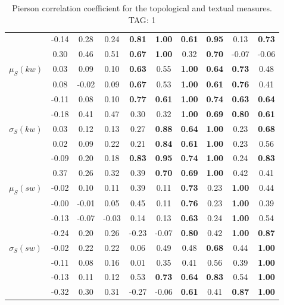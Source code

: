 \begin{table*}[h!]
\begin{center}
\begin{tabular}{| l || c | c | c | c | c | c | c | c | c |}
 & -0.14 & 0.28 & 0.24 & {\bf 0.81} & {\bf 1.00} & {\bf 0.61} & {\bf 0.95} & 0.13 & {\bf 0.73} \\
 & 0.30 & 0.46 & 0.51 & {\bf 0.67} & {\bf 1.00} & 0.32 & {\bf 0.70} & -0.07 & -0.06 \\\hline
$\mu_S(kw)$ & 0.03 & 0.09 & 0.10 & {\bf 0.63} & 0.55 & {\bf 1.00} & {\bf 0.64} & {\bf 0.73} & 0.48 \\
 & 0.08 & -0.02 & 0.09 & {\bf 0.67} & 0.53 & {\bf 1.00} & {\bf 0.61} & {\bf 0.76} & 0.41 \\
 & -0.11 & 0.08 & 0.10 & {\bf 0.77} & {\bf 0.61} & {\bf 1.00} & {\bf 0.74} & {\bf 0.63} & {\bf 0.64} \\
 & -0.18 & 0.41 & 0.47 & 0.30 & 0.32 & {\bf 1.00} & {\bf 0.69} & {\bf 0.80} & {\bf 0.61} \\\hline
$\sigma_S(kw)$ & 0.03 & 0.12 & 0.13 & 0.27 & {\bf 0.88} & {\bf 0.64} & {\bf 1.00} & 0.23 & {\bf 0.68} \\
 & 0.02 & 0.09 & 0.22 & 0.21 & {\bf 0.84} & {\bf 0.61} & {\bf 1.00} & 0.23 & 0.56 \\
 & -0.09 & 0.20 & 0.18 & {\bf 0.83} & {\bf 0.95} & {\bf 0.74} & {\bf 1.00} & 0.24 & {\bf 0.83} \\
 & 0.37 & 0.26 & 0.32 & 0.39 & {\bf 0.70} & {\bf 0.69} & {\bf 1.00} & 0.42 & 0.41 \\\hline
$\mu_S(sw)$ & -0.02 & 0.10 & 0.11 & 0.39 & 0.11 & {\bf 0.73} & 0.23 & {\bf 1.00} & 0.44 \\
 & -0.00 & -0.01 & 0.05 & 0.45 & 0.11 & {\bf 0.76} & 0.23 & {\bf 1.00} & 0.39 \\
 & -0.13 & -0.07 & -0.03 & 0.14 & 0.13 & {\bf 0.63} & 0.24 & {\bf 1.00} & 0.54 \\
 & -0.24 & 0.20 & 0.26 & -0.23 & -0.07 & {\bf 0.80} & 0.42 & {\bf 1.00} & {\bf 0.87} \\\hline
$\sigma_S(sw)$ & -0.02 & 0.22 & 0.22 & 0.06 & 0.49 & 0.48 & {\bf 0.68} & 0.44 & {\bf 1.00} \\
 & -0.11 & 0.08 & 0.16 & 0.01 & 0.35 & 0.41 & 0.56 & 0.39 & {\bf 1.00} \\
 & -0.13 & 0.11 & 0.12 & 0.53 & {\bf 0.73} & {\bf 0.64} & {\bf 0.83} & 0.54 & {\bf 1.00} \\
 & -0.32 & 0.30 & 0.31 & -0.27 & -0.06 & {\bf 0.61} & 0.41 & {\bf 0.87} & {\bf 1.00} \\\hline
\end{tabular}
\caption{Pierson correlation coefficient for the topological and textual measures. TAG: 1}
\end{center}
\end{table*}